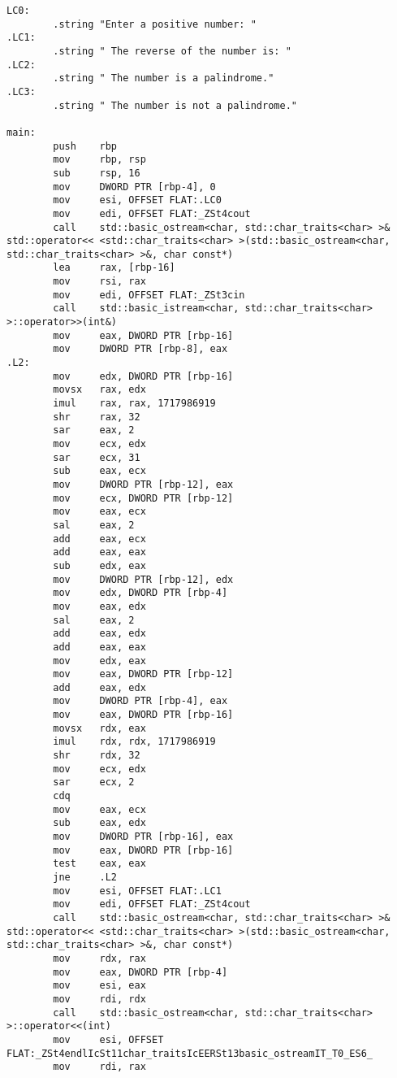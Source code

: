 \documentclass{article}
\theoremstyle{theorem}
\theoremstyle{definition}
\theoremstyle{remark}
\begin{document}
\begin{lstlisting}
LC0:
        .string "Enter a positive number: "
.LC1:
        .string " The reverse of the number is: "
.LC2:
        .string " The number is a palindrome."
.LC3:
        .string " The number is not a palindrome."
        
main:
        push    rbp
        mov     rbp, rsp
        sub     rsp, 16
        mov     DWORD PTR [rbp-4], 0
        mov     esi, OFFSET FLAT:.LC0
        mov     edi, OFFSET FLAT:_ZSt4cout
        call    std::basic_ostream<char, std::char_traits<char> >& std::operator<< <std::char_traits<char> >(std::basic_ostream<char, std::char_traits<char> >&, char const*)
        lea     rax, [rbp-16]
        mov     rsi, rax
        mov     edi, OFFSET FLAT:_ZSt3cin
        call    std::basic_istream<char, std::char_traits<char> >::operator>>(int&)
        mov     eax, DWORD PTR [rbp-16]
        mov     DWORD PTR [rbp-8], eax
.L2:
        mov     edx, DWORD PTR [rbp-16]
        movsx   rax, edx
        imul    rax, rax, 1717986919
        shr     rax, 32
        sar     eax, 2
        mov     ecx, edx
        sar     ecx, 31
        sub     eax, ecx
        mov     DWORD PTR [rbp-12], eax
        mov     ecx, DWORD PTR [rbp-12]
        mov     eax, ecx
        sal     eax, 2
        add     eax, ecx
        add     eax, eax
        sub     edx, eax
        mov     DWORD PTR [rbp-12], edx
        mov     edx, DWORD PTR [rbp-4]
        mov     eax, edx
        sal     eax, 2
        add     eax, edx
        add     eax, eax
        mov     edx, eax
        mov     eax, DWORD PTR [rbp-12]
        add     eax, edx
        mov     DWORD PTR [rbp-4], eax
        mov     eax, DWORD PTR [rbp-16]
        movsx   rdx, eax
        imul    rdx, rdx, 1717986919
        shr     rdx, 32
        mov     ecx, edx
        sar     ecx, 2
        cdq
        mov     eax, ecx
        sub     eax, edx
        mov     DWORD PTR [rbp-16], eax
        mov     eax, DWORD PTR [rbp-16]
        test    eax, eax
        jne     .L2
        mov     esi, OFFSET FLAT:.LC1
        mov     edi, OFFSET FLAT:_ZSt4cout
        call    std::basic_ostream<char, std::char_traits<char> >& std::operator<< <std::char_traits<char> >(std::basic_ostream<char, std::char_traits<char> >&, char const*)
        mov     rdx, rax
        mov     eax, DWORD PTR [rbp-4]
        mov     esi, eax
        mov     rdi, rdx
        call    std::basic_ostream<char, std::char_traits<char> >::operator<<(int)
        mov     esi, OFFSET FLAT:_ZSt4endlIcSt11char_traitsIcEERSt13basic_ostreamIT_T0_ES6_
        mov     rdi, rax

\end{lstlisting}
\end{document}
